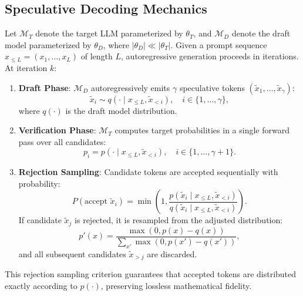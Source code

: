 \documentclass[runningheads]{llncs}
\begin{document}
\subsection{Speculative Decoding Mechanics}
Let $\mathcal{M}_T$ denote the target LLM parameterized by $\theta_T$, and $\mathcal{M}_D$ denote the draft model parameterized by $\theta_D$, where $|\theta_D| \ll |\theta_T|$. Given a prompt sequence $x_{\le L} = (x_1, \dots, x_L)$ of length $L$, autoregressive generation proceeds in iterations. At iteration $k$:
\begin{enumerate}
    \item \textbf{Draft Phase}: $\mathcal{M}_D$ autoregressively emits $\gamma$ speculative tokens $(\tilde{x}_{1}, \dots, \tilde{x}_{\gamma})$:
    \begin{equation}
        \tilde{x}_i \sim q(\cdot \mid x_{\le L}, \tilde{x}_{<i}), \quad i \in \{1, \dots, \gamma\},
    \end{equation}
    where $q(\cdot)$ is the draft model distribution.
    \item \textbf{Verification Phase}: $\mathcal{M}_T$ computes target probabilities in a single forward pass over all candidates:
    \begin{equation}
        p_i = p(\cdot \mid x_{\le L}, \tilde{x}_{<i}), \quad i \in \{1, \dots, \gamma + 1\}.
    \end{equation}
    \item \textbf{Rejection Sampling}: Candidate tokens are accepted sequentially with probability:
    \begin{equation}
        P(\text{accept } \tilde{x}_i) = \min\left(1, \frac{p(\tilde{x}_i \mid x_{\le L}, \tilde{x}_{<i})}{q(\tilde{x}_i \mid x_{\le L}, \tilde{x}_{<i})}\right).
    \end{equation}
    If candidate $\tilde{x}_j$ is rejected, it is resampled from the adjusted distribution:
    \begin{equation}
        p'(x) = \frac{\max(0, p(x) - q(x))}{\sum_{x'} \max(0, p(x') - q(x'))},
    \end{equation}
    and all subsequent candidates $\tilde{x}_{>j}$ are discarded.
\end{enumerate}
This rejection sampling criterion guarantees that accepted tokens are distributed exactly according to $p(\cdot)$, preserving lossless mathematical fidelity.
\end{document}
